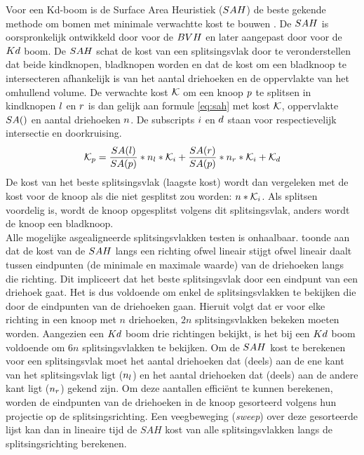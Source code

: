     Voor een Kd-boom is de Surface Area Heuristiek ($SAH$) de beste gekende methode om bomen met minimale verwachtte kost te bouwen \cite{ize}.
    De $SAH$ is oorspronkelijk ontwikkeld door \authorGoldsmithSalmon{} \cite{goldsmith1987automatic} voor de $BVH$ en later aangepast door \authorMacDonaldBooth{} \cite{macdonald1990heuristics} voor de $Kd$ boom. 
    De $SAH$ schat de kost van een splitsingsvlak door te veronderstellen dat beide kindknopen, bladknopen worden en dat de kost om een bladknoop te intersecteren afhankelijk is van het aantal driehoeken en de oppervlakte van het omhullend volume.
    De verwachte kost $\mathcal{K}$ om een knoop $p$ te splitsen in kindknopen ${l}$ en ${r}$ is dan gelijk aan formule \ref{eq:sah} met kost $\mathcal{K}$, oppervlakte $SA()$ en aantal driehoeken $n$.
    De subscripts ${i}$ en ${d}$ staan voor respectievelijk intersectie en doorkruising.
    \begin{equation}
        \label{eq:sah}
        \mathcal{K}_p = \frac{SA(l)}{SA(p)}*n_l*\mathcal{K}_i + \frac{SA(r)}{SA(p)}*n_r*\mathcal{K}_i + \mathcal{K}_d
    \end{equation}     
    De kost van het beste splitsingsvlak (laagste kost) wordt dan vergeleken met de kost voor de knoop als die niet gesplitst zou worden: $n*\mathcal{K}_i$.
    Als splitsen voordelig is, wordt de knoop opgesplitst volgens dit splitsingsvlak, anders wordt de knoop een bladknoop.
    \\

    Alle mogelijke asgealigneerde splitsingsvlakken testen is onhaalbaar. 
    \authorHavran{} \cite{havran2000heuristic} toonde aan dat de kost van de $SAH$ langs een richting ofwel lineair stijgt ofwel lineair daalt tussen eindpunten (de minimale en maximale waarde) van de driehoeken langs die richting.
    Dit impliceert dat het beste splitsingsvlak door een eindpunt van een driehoek gaat.
    Het is dus voldoende om enkel de splitsingsvlakken te bekijken die door de eindpunten van de driehoeken gaan.
    Hieruit volgt dat er voor elke richting in een knoop met $n$ driehoeken, $2n$ splitsingsvlakken bekeken moeten worden.
    Aangezien een $Kd$ boom drie richtingen bekijkt, is het bij een $Kd$ boom voldoende om $6n$ splitsingsvlakken te bekijken.
    Om de $SAH$ kost te berekenen voor een splitsingsvlak moet het aantal driehoeken dat (deels) aan de ene kant van het splitsingsvlak ligt ($n_l$) en het aantal driehoeken dat (deels) aan de andere kant ligt ($n_r$) gekend zijn.
    Om deze aantallen efficiënt te kunnen berekenen, worden de eindpunten van de driehoeken in de knoop gesorteerd volgens hun projectie op de splitsingsrichting.
    Een veegbeweging (\textit{sweep}) over deze gesorteerde lijst kan dan in lineaire tijd de $SAH$ kost van alle splitsingsvlakken langs de splitsingsrichting berekenen.


